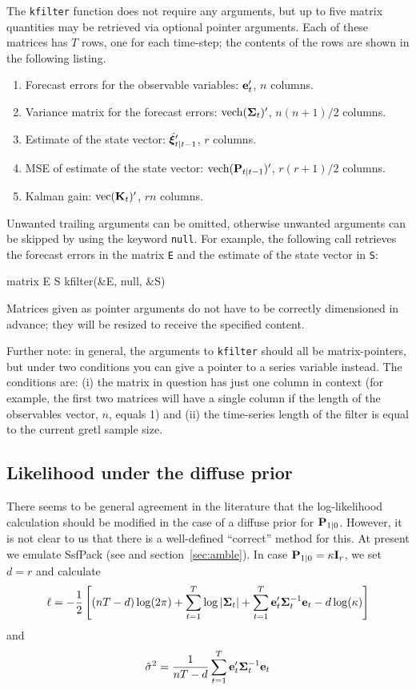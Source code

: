 The \texttt{kfilter} function does not require any arguments, but up
to five matrix quantities may be retrieved via optional pointer
arguments.  Each of these matrices has $T$ rows, one for each
time-step; the contents of the rows are shown in the following
listing.
%
\begin{enumerate}
\item Forecast errors for the observable variables: $\mathbf{e}_t'$, $n$
  columns.
\item Variance matrix for the forecast errors: $\mbox{vech}(\bm{\Sigma}_t)'$,
  $n(n+1)/2$ columns.
\item Estimate of the state vector: $\hat{\bm{\xi}}_{t|t-1}'$, $r$ columns.
\item MSE of estimate of the state vector:
  $\mbox{vech}(\mathbf{P}_{t|t-1})'$, $r(r+1)/2$ columns.
\item Kalman gain: $\mbox{vec}(\mathbf{K}_t)'$, $rn$ columns.
\end{enumerate}

Unwanted trailing arguments can be omitted, otherwise unwanted
arguments can be skipped by using the keyword \texttt{null}.  For
example, the following call retrieves the forecast errors in the
matrix \texttt{E} and the estimate of the state vector in \texttt{S}:
%
\begin{code}
matrix E S
kfilter(&E, null, &S)
\end{code}

Matrices given as pointer arguments do not have to be correctly
dimensioned in advance; they will be resized to receive the specified
content.

Further note: in general, the arguments to \texttt{kfilter} should all
be matrix-pointers, but under two conditions you can give a pointer to
a series variable instead.  The conditions are: (i) the matrix in
question has just one column in context (for example, the first two
matrices will have a single column if the length of the observables
vector, $n$, equals 1) and (ii) the time-series length of the filter
is equal to the current gretl sample size.

\subsection{Likelihood under the diffuse prior}

There seems to be general agreement in the literature that the
log-likelihood calculation should be modified in the case of a diffuse
prior for $\mathbf{P}_{1|0}$.  However, it is not clear to us that
there is a well-defined ``correct'' method for this.  At present we
emulate \textsf{SsfPack} (see \cite{koopman-etal99} and
section~\ref{sec:amble}).  In case $\mathbf{P}_{1|0} = \kappa
\mathbf{I}_r$, we set $d = r$ and calculate
%
\[
  \ell = -\frac{1}{2} \left[(nT-d) \log(2 \pi) + 
    \sum_{t=1}^T\log \left|\bm{\Sigma}_t\right| + 
    \sum_{t=1}^T\mathbf{e}_t'\bm{\Sigma}_t^{-1} \mathbf{e}_t
    - d \log(\kappa)
  \right]
\]
%
and
%
\[
\hat{\sigma}^2 = \frac{1}{nT-d} 
   \sum_{t=1}^T\mathbf{e}_t'\bm{\Sigma}_t^{-1} \mathbf{e}_t
\]

